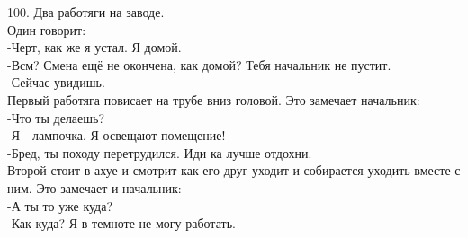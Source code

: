 \documentclass[a4paper,20pt,notitlepage]{extbook}
\begin{document}
	
	100. Два работяги на заводе.\\
	Один говорит:\\
	-Черт, как же я устал. Я домой.\\
	-Всм? Смена ещё не окончена, как домой? Тебя начальник не пустит.\\
	-Сейчас увидишь.\\
	Первый работяга повисает на трубе вниз головой. Это замечает начальник:\\
	-Что ты делаешь?\\
	-Я - лампочка. Я освещают помещение!\\
	-Бред, ты походу перетрудился. Иди ка лучше отдохни.\\
	Второй стоит в ахуе и смотрит как его друг уходит и собирается уходить вместе с ним. Это замечает и начальник:\\
	-А ты то уже куда?\\
	-Как куда? Я в темноте не могу работать.\\
	
\end{document}
